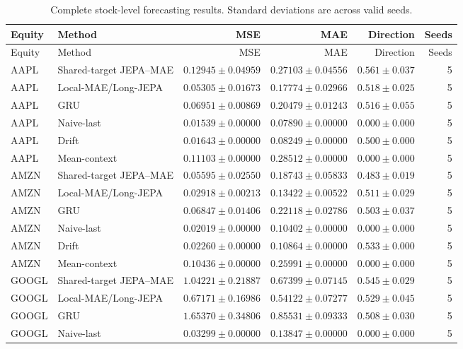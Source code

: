 \begin{longtable}{llrrrr}
\caption{Complete stock-level forecasting results. Standard deviations are across valid seeds.}\label{tab:appendix_stock_metrics}\\
\toprule
Equity & Method & MSE & MAE & Direction & Seeds \\
\midrule
\endfirsthead
\toprule
Equity & Method & MSE & MAE & Direction & Seeds \\
\midrule
\endhead
AAPL & Shared-target JEPA--MAE & $0.12945 \pm 0.04959$ & $0.27103 \pm 0.04556$ & $0.561 \pm 0.037$ & 5 \\
AAPL & Local-MAE/Long-JEPA & $0.05305 \pm 0.01673$ & $0.17774 \pm 0.02966$ & $0.518 \pm 0.025$ & 5 \\
AAPL & GRU & $0.06951 \pm 0.00869$ & $0.20479 \pm 0.01243$ & $0.516 \pm 0.055$ & 5 \\
AAPL & Naive-last & $0.01539 \pm 0.00000$ & $0.07890 \pm 0.00000$ & $0.000 \pm 0.000$ & 5 \\
AAPL & Drift & $0.01643 \pm 0.00000$ & $0.08249 \pm 0.00000$ & $0.500 \pm 0.000$ & 5 \\
AAPL & Mean-context & $0.11103 \pm 0.00000$ & $0.28512 \pm 0.00000$ & $0.000 \pm 0.000$ & 5 \\
AMZN & Shared-target JEPA--MAE & $0.05595 \pm 0.02550$ & $0.18743 \pm 0.05833$ & $0.483 \pm 0.019$ & 5 \\
AMZN & Local-MAE/Long-JEPA & $0.02918 \pm 0.00213$ & $0.13422 \pm 0.00522$ & $0.511 \pm 0.029$ & 5 \\
AMZN & GRU & $0.06847 \pm 0.01406$ & $0.22118 \pm 0.02786$ & $0.503 \pm 0.037$ & 5 \\
AMZN & Naive-last & $0.02019 \pm 0.00000$ & $0.10402 \pm 0.00000$ & $0.000 \pm 0.000$ & 5 \\
AMZN & Drift & $0.02260 \pm 0.00000$ & $0.10864 \pm 0.00000$ & $0.533 \pm 0.000$ & 5 \\
AMZN & Mean-context & $0.10436 \pm 0.00000$ & $0.25991 \pm 0.00000$ & $0.000 \pm 0.000$ & 5 \\
GOOGL & Shared-target JEPA--MAE & $1.04221 \pm 0.21887$ & $0.67399 \pm 0.07145$ & $0.545 \pm 0.029$ & 5 \\
GOOGL & Local-MAE/Long-JEPA & $0.67171 \pm 0.16986$ & $0.54122 \pm 0.07277$ & $0.529 \pm 0.045$ & 5 \\
GOOGL & GRU & $1.65370 \pm 0.34806$ & $0.85531 \pm 0.09333$ & $0.508 \pm 0.030$ & 5 \\
GOOGL & Naive-last & $0.03299 \pm 0.00000$ & $0.13847 \pm 0.00000$ & $0.000 \pm 0.000$ & 5 \\

\end{longtable}
